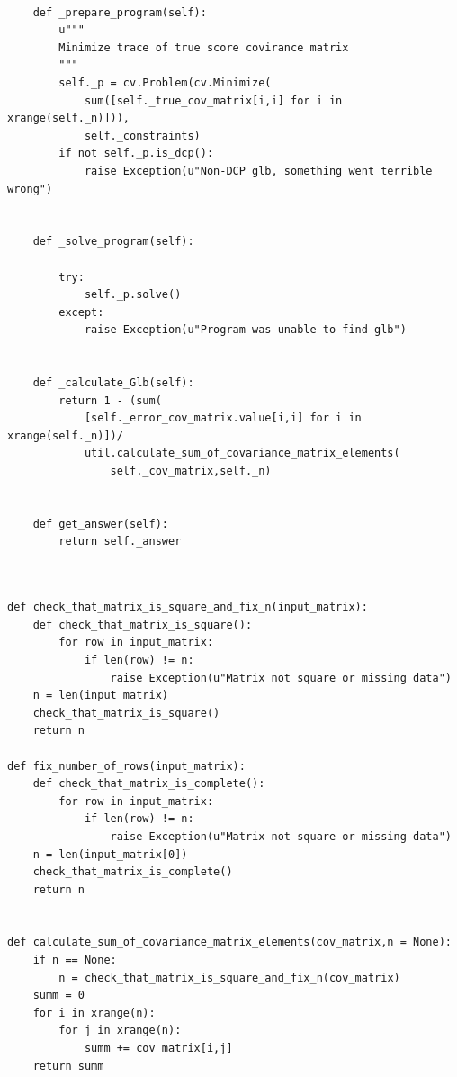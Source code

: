 \documentclass[a4paper,12pt,oneside]{article}
\newenvironment{customFloatWrap}{}{}
\numberwithin{equation}{section}
\theoremstyle{definition}
\begin{document}
\begin{customFloatWrap}
\begin{verbatim}
        
    def _prepare_program(self):
        u"""
        Minimize trace of true score covirance matrix
        """
        self._p = cv.Problem(cv.Minimize(
            sum([self._true_cov_matrix[i,i] for i in xrange(self._n)])),
            self._constraints)
        if not self._p.is_dcp():
            raise Exception(u"Non-DCP glb, something went terrible wrong")
            
            
    def _solve_program(self):

        try:
            self._p.solve()
        except:
            raise Exception(u"Program was unable to find glb")
        
    
    def _calculate_Glb(self):
        return 1 - (sum(
        	[self._error_cov_matrix.value[i,i] for i in xrange(self._n)])/
            util.calculate_sum_of_covariance_matrix_elements(
                self._cov_matrix,self._n)
        

    def get_answer(self):
        return self._answer
        
\end{verbatim}
\end{customFloatWrap}

\vspace{10pt}

\begin{customFloatWrap}
\begin{verbatim}

def check_that_matrix_is_square_and_fix_n(input_matrix):      
    def check_that_matrix_is_square():   
        for row in input_matrix:
            if len(row) != n:
                raise Exception(u"Matrix not square or missing data")  
    n = len(input_matrix) 
    check_that_matrix_is_square()
    return n

def fix_number_of_rows(input_matrix):
    def check_that_matrix_is_complete():   
        for row in input_matrix:
            if len(row) != n:
                raise Exception(u"Matrix not square or missing data")
    n = len(input_matrix[0])
    check_that_matrix_is_complete()
    return n
    

def calculate_sum_of_covariance_matrix_elements(cov_matrix,n = None):
    if n == None:
        n = check_that_matrix_is_square_and_fix_n(cov_matrix)
    summ = 0
    for i in xrange(n):
        for j in xrange(n):
            summ += cov_matrix[i,j]
    return summ

\end{verbatim}
\end{customFloatWrap}
\end{document}
